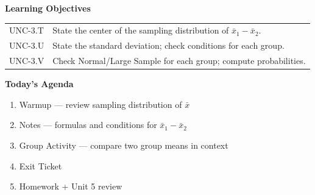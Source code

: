 \documentclass[10pt]{article}
\begin{document}
\namedateperiod

\begin{objectivebox}
\textbf{Learning Objectives}

\medskip
\begin{tabularx}{\linewidth}{@{} l X @{}}
UNC-3.T & State the center of the sampling distribution of $\bar{x}_1 - \bar{x}_2$.\\[4pt]
UNC-3.U & State the standard deviation; check conditions for each group.\\[4pt]
UNC-3.V & Check Normal/Large Sample for each group; compute probabilities.\\
\end{tabularx}
\end{objectivebox}

\begin{tocbox}
\textbf{Today's Agenda}
\begin{enumerate}
  \item Warmup --- review sampling distribution of $\bar{x}$
  \item Notes --- formulas and conditions for $\bar{x}_1 - \bar{x}_2$
  \item Group Activity --- compare two group means in context
  \item Exit Ticket
  \item Homework + Unit 5 review
\end{enumerate}
\end{tocbox}
\end{document}
